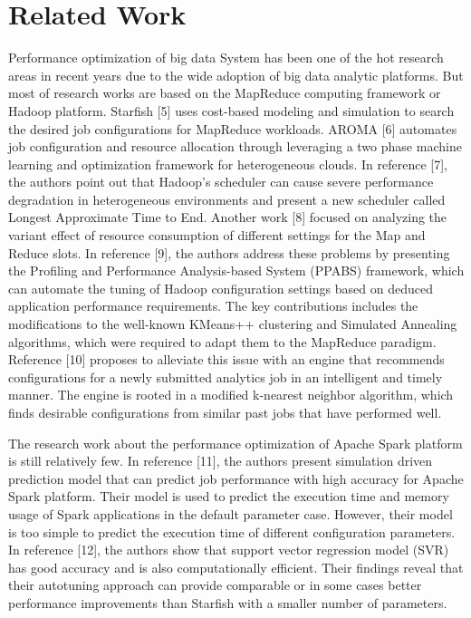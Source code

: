 \section{Related Work}\label{sec:related}
\par Performance optimization of big data System has been one of the hot research areas in recent years due to the wide adoption of big data analytic platforms. But most of research works are based on the MapReduce computing framework or Hadoop platform. Starfish [5] uses cost-based modeling and simulation to search the desired job configurations for MapReduce workloads. AROMA [6] automates job configuration and resource allocation through leveraging a two phase machine learning and optimization framework for heterogeneous clouds. In reference [7], the authors point out that Hadoop's scheduler can cause severe performance
degradation in heterogeneous environments and present a new scheduler called Longest Approximate Time to End. Another work [8] focused on analyzing the variant effect of resource consumption of different settings for the Map and Reduce slots. In reference [9], the authors address these problems by presenting the Profiling and Performance Analysis-based System (PPABS) framework, which can automate the tuning of Hadoop configuration settings based on deduced application performance requirements. The key contributions includes the modifications to the well-known KMeans++ clustering and Simulated Annealing algorithms, which were required to adapt them to the MapReduce paradigm. Reference [10] proposes to alleviate this issue with an engine that recommends configurations for a newly submitted analytics job in an intelligent and timely manner. The engine is rooted in a modified k-nearest neighbor algorithm, which finds desirable configurations from similar past jobs that have performed well.

\par  The research work about the performance optimization of Apache Spark platform is still relatively few. In reference [11], the authors present simulation driven prediction model that can predict job performance with high accuracy for Apache Spark platform. Their model is used to predict the execution time and memory usage of Spark applications in the default parameter case. However, their model is too simple to
predict the execution time of different configuration parameters. In reference [12], the authors show that support vector regression model (SVR) has good accuracy and is also computationally efficient. Their findings reveal that their autotuning approach can provide comparable or in some cases better performance improvements than Starfish with a smaller number of parameters.
